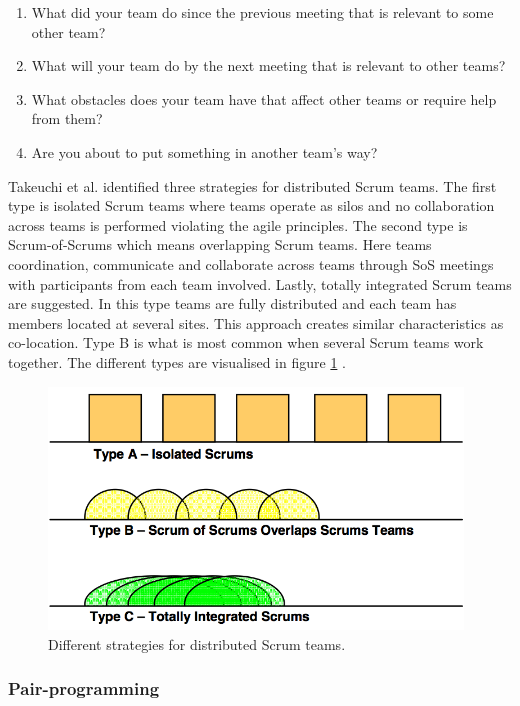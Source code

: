 \begin{enumerate}
  \item What did your team do since the previous meeting that is relevant to some other team?
  \item What will your team do by the next meeting that is relevant to other teams?
  \item What obstacles does your team have that affect other teams or require help from them?
  \item Are you about to put something in another team's way?
\end{enumerate}

Takeuchi et al. identified three strategies for distributed Scrum teams. The first type is isolated Scrum teams where teams operate as silos and no collaboration across teams is performed violating the agile principles. The second type is Scrum-of-Scrums which means overlapping Scrum teams. Here teams coordination, communicate and collaborate across teams through SoS meetings with participants from each team involved. Lastly, totally integrated Scrum teams are suggested. In this type teams are fully distributed and each team has members located at several sites. This approach creates similar characteristics as co-location. Type B is what is most common when several Scrum teams work together. The different types are visualised in figure \ref{distributedscrum} \cite{takeuchi2004}.

\begin{figure}[ht!]
\centering
\includegraphics[width=110mm]{images/distributed_scrum.png}
\caption{Different strategies for distributed Scrum teams.}
\label{distributedscrum}
\end{figure}

\subsubsection{Pair-programming}



